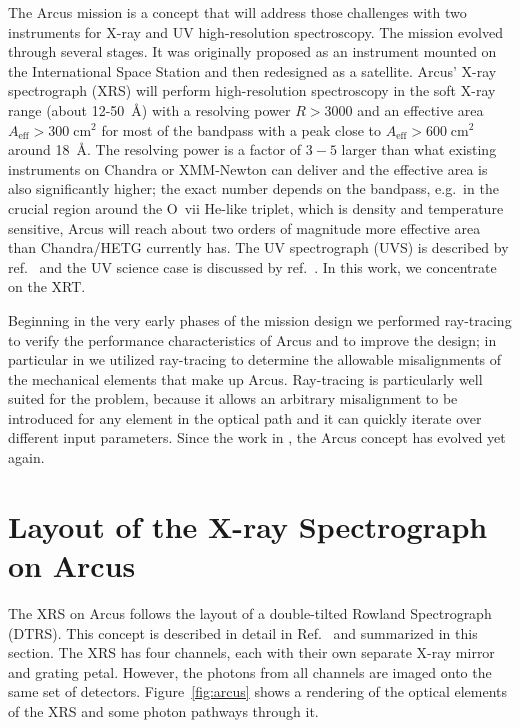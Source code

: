 \documentclass[12pt]{spieman}  %
\begin{document}
\begin{spacing}{2}
The Arcus mission is a concept that will address those challenges with two instruments for X-ray and UV high-resolution spectroscopy. The mission evolved through several stages. It was originally
proposed as an instrument mounted on the International Space Station\cite{10.1117/12.2062671} and then redesigned as a satellite\cite{10.1117/12.2231778,10.1117/12.2272818}. Arcus' X-ray spectrograph (XRS) will perform
high-resolution spectroscopy in the soft X-ray range (about 12-50~\AA{}) with a resolving power $R>3000$ and an effective area $A_\textrm{eff}>
300\;\mathrm{cm}^2$ for most of the bandpass with a peak close to $A_\textrm{eff} > 600\;\mathrm{cm}^2$ around 18~\AA{}. The resolving power is a factor of
$3-5$ larger than what existing instruments on Chandra or XMM-Newton can
deliver and the effective area is also significantly higher; the exact number
depends on the bandpass, e.g.\ in the crucial region around the O~{\sc vii}
He-like triplet, which is density and temperature sensitive, Arcus will reach
about two orders of magnitude more effective area than Chandra/HETG currently
has. The UV spectrograph (UVS) is described by ref.~ and the UV science case is discussed by ref.~. In this work, we concentrate on the XRT.

Beginning in the very early phases of the mission design we performed
ray-tracing to verify the performance characteristics of Arcus and to
improve the design\cite{10.1117/12.2232157}; in particular in  we utilized ray-tracing to determine the allowable misalignments of the mechanical elements that make up Arcus. Ray-tracing is particularly well suited for the problem, because it allows an arbitrary misalignment to be introduced for any element in the optical path and it can quickly iterate over different input parameters. Since the work in , the Arcus concept has evolved yet again.


\section{Layout of the X-ray Spectrograph on Arcus}
The XRS on Arcus follows the layout of a double-tilted Rowland Spectrograph (DTRS). This concept is described in detail in Ref.~ and summarized in this section. The XRS has four channels, each with their own separate X-ray mirror and grating petal. However, the photons from all channels are imaged onto the same set of detectors. Figure~\ref{fig:arcus} shows a rendering of the optical elements of the XRS and some photon pathways through it.


\end{spacing}
\end{document}

